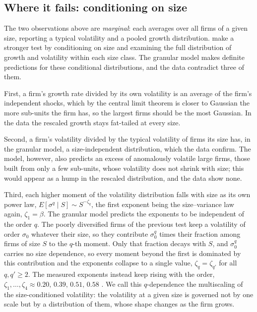 \subsection{Where it fails: conditioning on size}
\label{sec:intro-granular-fail}

The two observations above are \emph{marginal}: each averages over all firms of a given size,
reporting a typical volatility and a pooled growth distribution. \citet{moran2024} make a
stronger test by conditioning on size and examining the full distribution of growth and
volatility within each size class. The granular model makes definite predictions for these
conditional distributions, and the data contradict three of them.

First, a firm's growth rate divided by its own
volatility is an average of the firm's
independent shocks, which by the central limit theorem is closer to Gaussian the more
sub-units the firm has, so the largest
firms should be the most Gaussian. In the data the rescaled growth
stays fat-tailed at every size.

Second, a firm's
volatility divided by the typical volatility of firms its size has, in the granular model, a
size-independent distribution, which the data confirm. The model, however, also predicts an
excess of anomalously volatile large firms, those built from only a few sub-units, whose
volatility does not shrink with size; this would appear as a hump in the rescaled
distribution, and the data show none.

Third, each higher moment of the volatility
distribution falls with size as its own power law,
$E[\sigma^q \mid S] \sim S^{-\zeta_q}$, the first exponent being the size--variance law again,
$\zeta_1 = \beta$. The granular
model predicts the exponents to be independent of the order $q$. The poorly diversified
firms of the previous test keep a volatility of order $\sigma_0$ whatever their size, so
they contribute $\sigma_0^q$ times their fraction among firms of size $S$ to the $q$-th
moment. Only that fraction decays with $S$, and $\sigma_0^q$ carries no size dependence,
so every moment beyond the first is dominated by this contribution and the exponents
collapse to a single value, $\zeta_q = \zeta_{q'}$ for all $q, q' \ge 2$. The measured exponents instead keep rising with the order,
$\zeta_1,\dots,\zeta_4 \approx 0.20,\,0.39,\,0.51,\,0.58$ \citep{moran2024}. We call this
$q$-dependence the multiscaling of the size-conditioned volatility: the volatility at a given
size is governed not by one scale but by a distribution of them, whose shape changes as the firm
grows.

